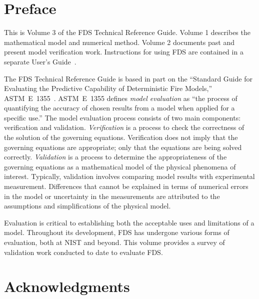 \documentclass[11pt]{book}
\begin{document}
\chapter{Preface}

This is Volume 3 of the FDS Technical Reference Guide. Volume 1 describes the mathematical model and numerical method. Volume 2 documents past and present model verification work. Instructions for using FDS are contained in a separate User's Guide~\cite{FDS_Users_Guide}.

The FDS Technical Reference Guide is based in part on the ``Standard Guide for Evaluating the Predictive Capability of Deterministic Fire Models,'' ASTM~E~1355~\cite{ASTM:E1355}. ASTM~E~1355 defines {\em model evaluation} as ``the process of quantifying the accuracy of chosen results from a model when applied for a specific use.'' The model evaluation process consists of two main components: verification and validation. {\em Verification} is a process to check the correctness of the solution of the governing equations. Verification does not imply that the governing equations are appropriate; only that the equations are being solved correctly. {\em Validation} is a process to determine the appropriateness of the governing equations as a mathematical model of the physical phenomena of interest. Typically, validation involves comparing model results with experimental measurement. Differences that cannot be explained in terms of numerical errors in the model or uncertainty in the measurements are attributed to the assumptions and simplifications of the physical model.

Evaluation is critical to establishing both the acceptable uses and limitations of a model. Throughout its development, FDS has undergone various forms of evaluation, both at NIST and beyond. This volume provides a survey of validation work conducted to date to evaluate FDS.




\chapter{Acknowledgments}
\label{acksection}
\end{document}
